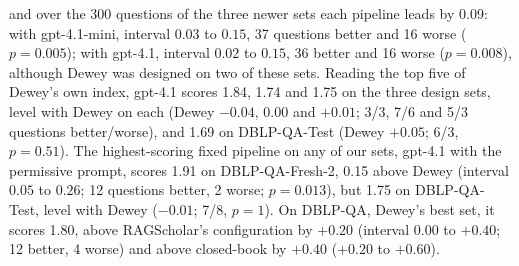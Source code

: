\documentclass[conference]{IEEEtran}
\newcommand{\dq}{DBLP-QA}
\newcommand{\freshb}{DBLP-QA-Fresh-2}
\newcommand{\test}{DBLP-QA-Test}
\begin{document}
and over the 300 questions of the three newer sets each pipeline leads by 0.09: with gpt-4.1-mini,
interval $0.03$ to $0.15$, 37 questions better and 16 worse ($p=0.005$); with gpt-4.1, interval $0.02$ to
$0.15$, 36 better and 16 worse ($p=0.008$), although Dewey was designed on two of these sets. Reading the top five of Dewey's own index, gpt-4.1
scores 1.84, 1.74 and 1.75 on the three design sets, level with Dewey on each (Dewey $-0.04$, $0.00$ and
$+0.01$; 3/3, 7/6 and 5/3 questions better/worse), and 1.69 on \test{} (Dewey $+0.05$; 6/3, $p=0.51$).
The highest-scoring fixed pipeline on any of our sets, gpt-4.1 with the permissive prompt, scores 1.91
on \freshb{}, 0.15 above Dewey (interval $0.05$ to $0.26$; 12 questions better, 2 worse; $p=0.013$), but
1.75 on \test{}, level with Dewey ($-0.01$; 7/8, $p=1$). On \dq{}, Dewey's best
set, it scores 1.80, above RAGScholar's configuration by $+0.20$ (interval $0.00$ to $+0.40$; 12 better,
4 worse) and above closed-book by $+0.40$ ($+0.20$ to $+0.60$).
\end{document}
